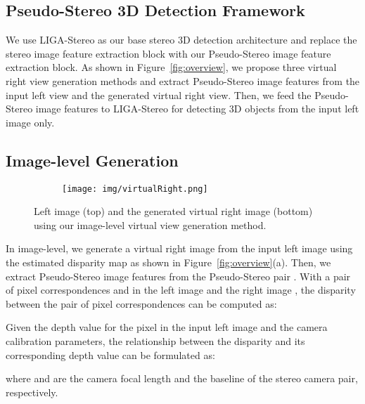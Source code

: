 \documentclass[10pt,twocolumn,letterpaper]{article}
\begin{document}
\subsection{Pseudo-Stereo 3D Detection Framework}
We use LIGA-Stereo \cite{guo2021liga} as our base stereo 3D detection architecture and replace the stereo image feature extraction block with our Pseudo-Stereo image feature extraction block. As shown in Figure~\ref{fig:overview}, we propose three virtual right view generation methods and extract Pseudo-Stereo image features from the input left view and the generated virtual right view. Then, we feed the Pseudo-Stereo image features to LIGA-Stereo for detecting 3D objects from the input left image only. 


\subsection{Image-level Generation}\label{sec:img2img}
\begin{figure}[t!]
    \centering
    \begin{subfigure}{\columnwidth}
    \centering
        \texttt{[image: img/virtualRight.png]}
    \end{subfigure}
    \vspace{-3mm}
    \caption{\small Left image (top) and the generated virtual right image (bottom) using our image-level virtual view generation method.}
    \label{fig:left2right}
    \vspace{-4mm}
\end{figure}

In image-level, we generate a virtual right image  from the input left image  using the estimated disparity map as shown in Figure~\ref{fig:overview}(a). Then, we extract Pseudo-Stereo image features from the Pseudo-Stereo pair . 
With a pair of pixel correspondences  and  in the left image  and the right image ,  
the disparity  between the pair of pixel correspondences can be computed as:

Given the depth value  for the pixel  in the input left image and the camera calibration parameters,
the relationship between the disparity  and its corresponding depth value  can be formulated as:

where  and  are the camera focal length and the baseline of the stereo camera pair, respectively.
\end{document}
